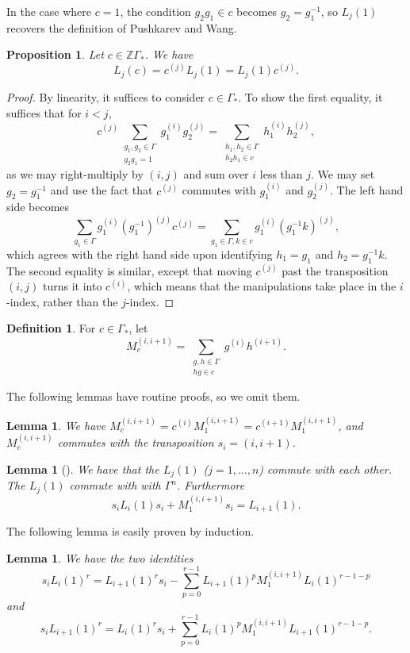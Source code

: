 \documentclass[10pt]{article}
\newtheorem{lemma}[theorem]{Lemma}
\newtheorem{proposition}[theorem]{Proposition}
\theoremstyle{definition}
\newtheorem{definition}[theorem]{Definition}
\begin{document}
In the case where $c = 1$, the condition $g_2g_1 \in c$ becomes $g_2 = g_1^{-1}$, so $L_j(1)$ recovers the definition of Pushkarev and Wang.
\begin{proposition}
Let $c \in \mathbb{Z}\Gamma_*$. We have
\[
L_j(c) = c^{(j)} L_j(1) = L_j(1) c^{(j)}.
\]
\end{proposition}
\begin{proof}
By linearity, it suffices to consider $c \in \Gamma_*$. To show the first equality, it suffices that for $i<j$,
\[
c^{(j)} \sum_{\substack{g_1, g_2 \in \Gamma \\ g_2g_1 = 1}} g_1^{(i)} g_2^{(j)} = \sum_{\substack{h_1, h_2 \in \Gamma \\ h_2h_1 \in c}} h_1^{(i)} h_2^{(j)},
\]
as we may right-multiply by $(i,j)$ and sum over $i$ less than $j$. We may set $g_2 = g_1^{-1}$ and use the fact that $c^{(j)}$ commutes with $g_1^{(i)}$ and $g_2^{(j)}$. The left hand side becomes
\[
\sum_{g_1 \in \Gamma} g_1^{(i)} (g_1^{-1})^{(j)} c^{(j)} = \sum_{g_1 \in \Gamma, k \in c} g_1^{(i)} (g_1^{-1} k)^{(j)},
\]
which agrees with the right hand side upon identifying $h_1 = g_1$ and $h_2 = g_1^{-1}k$. The second equality is similar, except that moving $c^{(j)}$ past the transposition $(i, j)$ turns it into $c^{(i)}$, which means that the manipulations take place in the $i$-index, rather than the $j$-index.
\end{proof}



\begin{definition}
For $c \in \Gamma_*$, let
\[
M_c^{(i,i+1)} = \sum_{\substack{g,h \in \Gamma \\ hg \in c}} g^{(i)}h^{(i+1)}.
\]
\end{definition}


The following lemmas have routine proofs, so we omit them.
\begin{lemma}
We have $M_c^{(i,i+1)} = c^{(i)} M_1^{(i,i+1)}  = c^{(i+1)} M_1^{(i,i+1)}$, and $M_c^{(i,i+1)}$ commutes with the transposition $s_i = (i, i+1)$.
\end{lemma}

\begin{lemma}[{\cite[Proposition 5]{Pushkarev}}]
We have that the $L_j(1)$ \textup{(}$j=1,\ldots,n$\textup{)} commute with each other. 
The $L_j(1)$ commute with with $\Gamma^n$. Furthermore
\[
s_i L_i(1) s_i + M_1^{(i,i+1)} s_i = L_{i+1}(1).
\]
\end{lemma}

The following lemma is easily proven by induction.
\begin{lemma} \label{iterative_swap_lemma}
We have the two identities
\[
s_i L_i(1)^r = L_{i+1}(1)^r s_i - \sum_{p=0}^{r-1} L_{i+1}(1)^p M_1^{(i,i+1)} L_i(1)^{r-1-p}
\]
and
\[
s_i L_{i+1}(1)^r = L_{i}(1)^r s_i + \sum_{p=0}^{r-1} L_{i}(1)^p M_1^{(i,i+1)} L_{i+1}(1)^{r-1-p}.
\]
\end{lemma}
\end{document}
